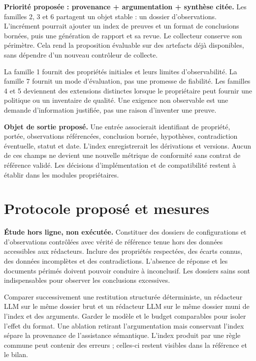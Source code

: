 \documentclass[11pt,a4paper]{article}
\begin{document}
\textbf{Priorité proposée : provenance + argumentation + synthèse citée.} Les familles 2, 3 et 6 partagent un objet stable : un dossier d'observations. L'incrément pourrait ajouter un index de preuves et un format de conclusions bornées, puis une génération de rapport et sa revue. Le collecteur conserve son périmètre. Cela rend la proposition évaluable sur des artefacts déjà disponibles, sans dépendre d'un nouveau contrôleur de collecte.

La famille 1 fournit des propriétés initiales et leurs limites d'observabilité. La famille 7 fournit un mode d'évaluation, pas une promesse de fiabilité. Les familles 4 et 5 deviennent des extensions distinctes lorsque le propriétaire peut fournir une politique ou un inventaire de qualité. Une exigence non observable est une demande d'information justifiée, pas une raison d'inventer une preuve.

\textbf{Objet de sortie proposé.} Une entrée associerait identifiant de propriété, portée, observations référencées, conclusion bornée, hypothèses, contradiction éventuelle, statut et date. L'index enregistrerait les dérivations et versions. Aucun de ces champs ne devient une nouvelle métrique de conformité sans contrat de référence validé. Les décisions d'implémentation et de compatibilité restent à établir dans les modules propriétaires.

\newpage
\section{Protocole proposé et mesures}
\textbf{Étude hors ligne, non exécutée.} Constituer des dossiers de configurations et d'observations contrôlées avec vérité de référence tenue hors des données accessibles aux rédacteurs. Inclure des propriétés respectées, des écarts connus, des données incomplètes et des contradictions. L'absence de réponse et les documents périmés doivent pouvoir conduire à inconclusif. Les dossiers sains sont indispensables pour observer les conclusions excessives.

Comparer successivement une restitution structurée déterministe, un rédacteur LLM sur le même dossier brut et un rédacteur LLM sur le même dossier muni de l'index et des arguments. Garder le modèle et le budget comparables pour isoler l'effet du format. Une ablation retirant l'argumentation mais conservant l'index sépare la provenance de l'assistance sémantique. L'index produit par une règle commune peut contenir des erreurs ; celles-ci restent visibles dans la référence et le bilan.
\end{document}
